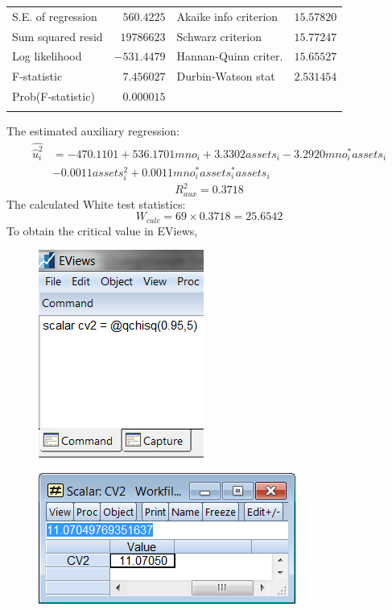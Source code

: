 \documentclass[12pt]{report}
\begin{document}
\begin{table}[H]
\begin{tabular}{lrrrr}
		\multicolumn{1}{l}{S.E. of regression}&\multicolumn{1}{r}{$560.4225$}&\multicolumn{2}{l}{Akaike info criterion}&\multicolumn{1}{r}{$15.57820$}\\
		\multicolumn{1}{l}{Sum squared resid}&\multicolumn{1}{r}{$19786623$}&\multicolumn{2}{l}{Schwarz criterion}&\multicolumn{1}{r}{$15.77247$}\\
		\multicolumn{1}{l}{Log likelihood}&\multicolumn{1}{r}{$-531.4479$}&\multicolumn{2}{l}{Hannan-Quinn criter.}&\multicolumn{1}{r}{$15.65527$}\\
		\multicolumn{1}{l}{F-statistic}&\multicolumn{1}{r}{$7.456027$}&\multicolumn{2}{l}{Durbin-Watson stat}&\multicolumn{1}{r}{$2.531454$}\\
		\multicolumn{1}{l}{Prob(F-statistic)}&\multicolumn{1}{r}{$0.000015$}&\multicolumn{1}{c}{}&\multicolumn{1}{c}{}&\multicolumn{1}{c}{}\\
		[4.5pt] \hline \\ [-4.5pt]
	\end{tabular}
\end{table}
\vspace{-\baselineskip} \noindent The estimated auxiliary regression:
\begin{align*}
	\widehat{\hat{u}^2_i} &= -470.1101 + 536.1701 mno_i + 3.3302 assets_i -3.2920 mno_i ^* assets_i \\
	&-0.0011 assets_i^2 + 0.0011 mno_i^*assets_i^*assets_i
\end{align*}
$$R^2_{aux} = 0.3718$$ The calculated White test statistics:
$$W_{calc} = 69 \times 0.3718 = 25.6542$$ \noindent To obtain the critical value in EViews,
\begin{figure}[H]
	\centering
	\includegraphics{tute9_4}
\end{figure}
\vspace{-\baselineskip}
\begin{figure}[H]
	\centering
	\includegraphics{tute9_5}
\end{figure}
\vspace{-\baselineskip}
\end{document}
